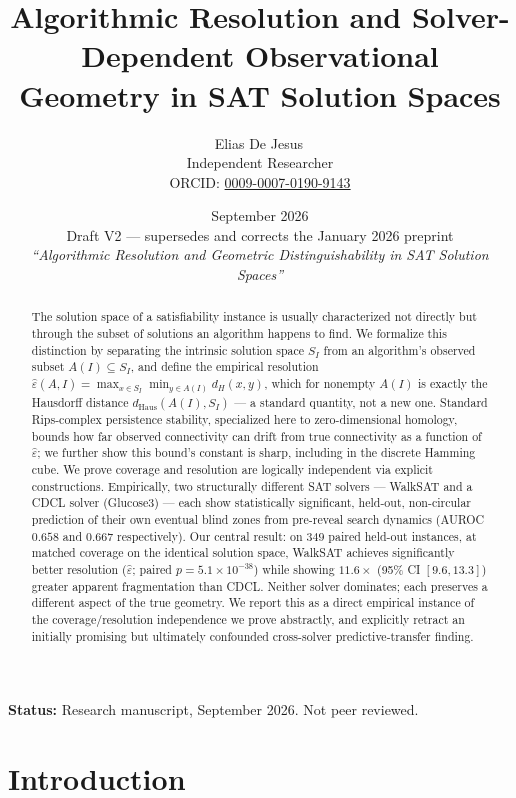 \documentclass[11pt]{article}
\title{\textbf{Algorithmic Resolution and Solver-Dependent Observational Geometry in SAT Solution Spaces}}
\author{
Elias De Jesus\,\orcidlink{0009-0007-0190-9143} \\
\small Independent Researcher \\
\small ORCID: \href{https://orcid.org/0009-0007-0190-9143}{0009-0007-0190-9143}
}
\date{September 2026 \\ \small Draft V2 --- supersedes and corrects the January 2026 preprint \\ \small \emph{``Algorithmic Resolution and Geometric Distinguishability in SAT Solution Spaces''}}
\theoremstyle{definition}
\theoremstyle{remark}
\newcommand{\Shat}{S_I}
\newcommand{\Ahat}[1]{A(#1)}
\newcommand{\dH}{d_H}
\newcommand{\dHaus}{d_{\mathrm{Haus}}}
\newcommand{\epshat}{\hat\varepsilon}
\begin{document}
\maketitle

\begin{abstract}
\noindent
The solution space of a satisfiability instance is usually characterized not directly but through the subset of solutions an algorithm happens to find. We formalize this distinction by separating the intrinsic solution space $\Shat$ from an algorithm's observed subset $\Ahat{I} \subseteq \Shat$, and define the empirical resolution $\epshat(A,I) = \max_{x \in \Shat} \min_{y \in \Ahat{I}} \dH(x,y)$, which for nonempty $\Ahat{I}$ is exactly the Hausdorff distance $\dHaus(\Ahat{I}, \Shat)$ --- a standard quantity, not a new one. Standard Rips-complex persistence stability, specialized here to zero-dimensional homology, bounds how far observed connectivity can drift from true connectivity as a function of $\epshat$; we further show this bound's constant is sharp, including in the discrete Hamming cube. We prove coverage and resolution are logically independent via explicit constructions. Empirically, two structurally different SAT solvers --- WalkSAT and a CDCL solver (Glucose3) --- each show statistically significant, held-out, non-circular prediction of their own eventual blind zones from pre-reveal search dynamics (AUROC $0.658$ and $0.667$ respectively). Our central result: on $349$ paired held-out instances, at matched coverage on the identical solution space, WalkSAT achieves significantly better resolution ($\epshat$; paired $p=5.1\times10^{-38}$) while showing $11.6\times$ (95\% CI $[9.6,13.3]$) greater apparent fragmentation than CDCL. Neither solver dominates; each preserves a different aspect of the true geometry. We report this as a direct empirical instance of the coverage/resolution independence we prove abstractly, and explicitly retract an initially promising but ultimately confounded cross-solver predictive-transfer finding.
\end{abstract}

\noindent\textbf{Status:} Research manuscript, September 2026. Not peer reviewed.

\tableofcontents

\section{Introduction}
\end{document}
